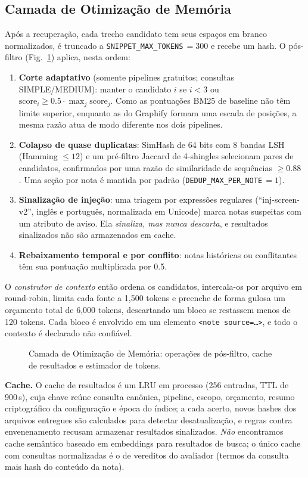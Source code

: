 \documentclass[conference,onecolumn,11pt]{IEEEtran}
\begin{document}
\subsection{Camada de Otimização de Memória}\label{sec:opt}
Após a recuperação, cada trecho candidato tem seus espaços em branco normalizados, é truncado a \texttt{SNIPPET\_MAX\_TOKENS}\,$=300$ e recebe um hash. O pós-filtro (Fig.~\ref{fig:opt}) aplica, nesta ordem:
\begin{enumerate}
\item \textbf{Corte adaptativo} (somente pipelines gratuitos; consultas SIMPLE/MEDIUM): manter o candidato $i$ se $i<3$ ou $\mathrm{score}_i\ge 0.5\cdot\max_j \mathrm{score}_j$. Como as pontuações BM25 de baseline não têm limite superior, enquanto as do Graphify formam uma escada de posições, a mesma razão atua de modo diferente nos dois pipelines.
\item \textbf{Colapso de quase duplicatas}: SimHash de 64 bits com 8 bandas LSH (Hamming $\le12$) e um pré-filtro Jaccard de 4-shingles selecionam pares de candidatos, confirmados por uma razão de similaridade de sequências $\ge 0.88$ \cite{charikar2002simhash,manku2007nearduplicates,broder1997resemblance}. Uma seção por nota é mantida por padrão (\texttt{DEDUP\_MAX\_PER\_NOTE}\,$=1$).
\item \textbf{Sinalização de injeção}: uma triagem por expressões regulares (``inj-screen-v2'', inglês e português, normalizada em Unicode) marca notas suspeitas com um atributo de aviso. Ela \emph{sinaliza, mas nunca descarta}, e resultados sinalizados não são armazenados em cache.
\item \textbf{Rebaixamento temporal e por conflito}: notas históricas ou conflitantes têm sua pontuação multiplicada por 0.5.
\end{enumerate}
O \emph{construtor de contexto} então ordena os candidatos, intercala-os por arquivo em round-robin, limita cada fonte a 1,500 tokens e preenche de forma gulosa um orçamento total de 6,000 tokens, descartando um bloco se restassem menos de 120 tokens. Cada bloco é envolvido em um elemento \texttt{<note source=\dots>}, e todo o contexto é declarado não confiável.

\begin{figure}[!htbp]\centering
{}
\caption{Camada de Otimização de Memória: operações de pós-filtro, cache de resultados e estimador de tokens.}\label{fig:opt}
\end{figure}

\textbf{Cache.} O cache de resultados é um LRU em processo (256 entradas, TTL de 900\,s), cuja chave reúne consulta canônica, pipeline, escopo, orçamento, resumo criptográfico da configuração e época do índice; a cada acerto, novos hashes dos arquivos entregues são calculados para detectar desatualização, e regras contra envenenamento recusam armazenar resultados sinalizados. \emph{Não} encontramos cache semântico baseado em embeddings para resultados de busca; o único cache com consultas normalizadas é o de vereditos do avaliador (termos da consulta mais hash do conteúdo da nota).
\end{document}
